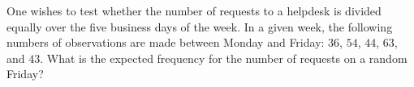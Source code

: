 One wishes to test whether the number of requests to a helpdesk is divided equally over the five business days of the week.
In a given week, the following numbers of observations are made between Monday and Friday: $36$, $54$, $44$, $63$, and $43$. 
What is the expected frequency for the number of requests on a random Friday?